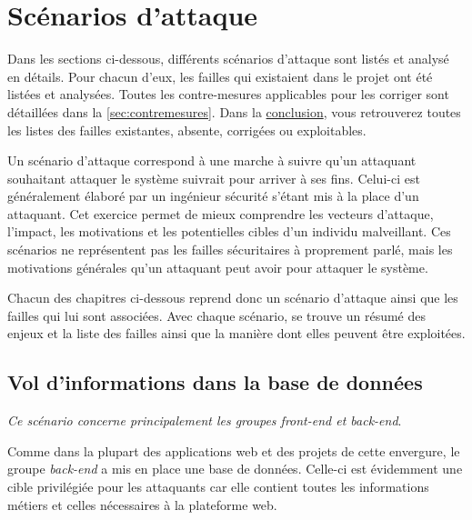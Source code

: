 \documentclass[12pt]{article}
\begin{document}
\section{Scénarios d'attaque}
\label{sec:scenarios}

Dans les sections ci-dessous, différents scénarios d'attaque sont listés et analysé en détails. Pour chacun d'eux, les failles qui existaient dans le projet ont été listées et analysées. Toutes les contre-mesures applicables pour les corriger sont détaillées dans la \autoref{sec:contremesures}. Dans la \hyperref[sec:conclusion]{conclusion}, vous retrouverez toutes les listes des failles existantes, absente, corrigées ou exploitables.

Un scénario d'attaque correspond à une marche à suivre qu'un attaquant souhaitant attaquer le système suivrait pour arriver à ses fins. Celui-ci est généralement élaboré par un ingénieur sécurité s'étant mis à la place d'un attaquant. Cet exercice permet de mieux comprendre les vecteurs d'attaque, l'impact, les motivations et les potentielles cibles d'un individu malveillant. Ces scénarios ne représentent pas les failles sécuritaires à proprement parlé, mais les motivations générales qu'un attaquant peut avoir pour attaquer le système.

Chacun des chapitres ci-dessous reprend donc un scénario d'attaque ainsi que les failles qui lui sont associées. Avec chaque scénario, se trouve un résumé des enjeux et la liste des failles ainsi que la manière dont elles peuvent être exploitées.

\subsection{Vol d'informations dans la base de données}

\emph{Ce scénario concerne principalement les groupes front-end et back-end}.
\medskip

Comme dans la plupart des applications web et des projets de cette envergure, le groupe \emph{back-end} a mis en place une base de données. Celle-ci est évidemment une cible privilégiée pour les attaquants car elle contient toutes les informations métiers et celles nécessaires à la plateforme web.
\medskip
\end{document}
